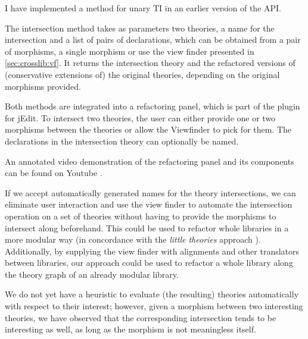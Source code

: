 I have implemented a method for unary TI in an earlier version of the \mmt API.

The intersection method takes as parameters two theories, a name for the intersection and a list of pairs of declarations, which can be obtained from a pair of morphisms, a single morphism or use the view finder presented in \autoref{sec:crosslib:vf}. It returns the intersection theory and the refactored versions of (conservative extensions of) the original theories, depending on the original morphisms provided.

Both methods are integrated into a refactoring panel, which is part of the \mmt plugin for jEdit. To intersect two theories, the user can either provide one or two morphisms between the theories or allow the Viewfinder to pick for them. The declarations in the intersection theory can optionally be named.

An annotated video demonstration of the refactoring panel and its components can be found on Youtube \cite{YTInters}.


If we accept automatically generated names for the theory intersections, we can eliminate user interaction and use the view finder to automate the intersection operation on a set of theories without having to provide the morphisms to intersect along beforehand. This could be used to refactor whole libraries in a more modular way (in concordance with the \emph{little theories} approach \cite{FaGu:lt92}). Additionally, by supplying the view finder with alignments and other translators between libraries, our approach could be used to refactor a whole library along the theory graph of an already modular library.


We do not yet have a heuristic to evaluate (the resulting) theories automatically with respect to their interest; however, given a morphism between two interesting theories, we have observed that the corresponding intersection tends to be interesting as well, as long as the morphism is not meaningless itself.
